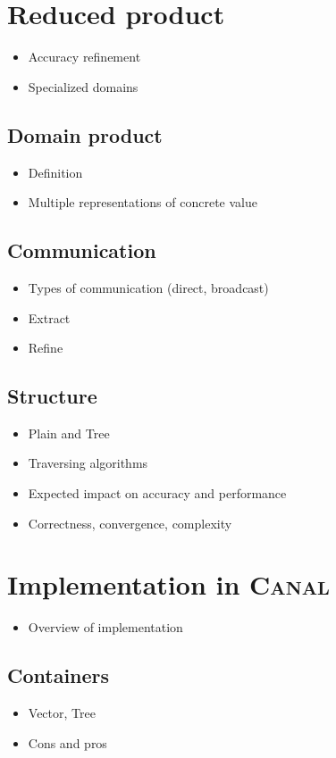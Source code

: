\documentclass[12pt,oneside,draft]{fithesis2}
\begin{document}
\chapter{Reduced product}
\begin{itemize}
  \item Accuracy refinement
  \item Specialized domains
\end{itemize}

\section{Domain product}
\begin{itemize}
  \item Definition
  \item Multiple representations of concrete value
\end{itemize}

\section{Communication}
\begin{itemize}
  \item Types of communication (direct, broadcast)
  \item Extract
  \item Refine
\end{itemize}

\section{Structure}
\begin{itemize}
  \item Plain and Tree
  \item Traversing algorithms
  \item Expected impact on accuracy and performance
  \item Correctness, convergence, complexity
\end{itemize}


\chapter{Implementation in \textsc{Canal}}
\begin{itemize}
  \item Overview of implementation
\end{itemize}

\section{Containers}
\begin{itemize}
  \item Vector, Tree
  \item Cons and pros
\end{itemize}
\end{document}
